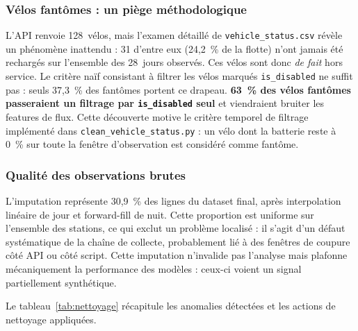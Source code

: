 \documentclass[fleqn, 12pt]{scrartcl}
\begin{document}
\subsubsection*{Vélos fantômes : un piège méthodologique}

L'API renvoie 128~vélos, mais l'examen détaillé de \texttt{vehicle\_status.csv} révèle un phénomène inattendu : 31 d'entre eux (24{,}2~\% de la flotte) n'ont jamais été rechargés sur l'ensemble des 28~jours observés. Ces vélos sont donc \emph{de fait} hors service. Le critère naïf consistant à filtrer les vélos marqués \texttt{is\_disabled} ne suffit pas : seuls 37{,}3~\% des fantômes portent ce drapeau. \textbf{63~\% des vélos fantômes passeraient un filtrage par \texttt{is\_disabled} seul} et viendraient bruiter les features de flux. Cette découverte motive le critère temporel de filtrage implémenté dans \texttt{clean\_vehicle\_status.py} : un vélo dont la batterie reste à 0~\% sur toute la fenêtre d'observation est considéré comme fantôme.

\subsubsection*{Qualité des observations brutes}

L'imputation représente 30{,}9~\% des lignes du dataset final, après interpolation linéaire de jour et forward-fill de nuit. Cette proportion est uniforme sur l'ensemble des stations, ce qui exclut un problème localisé : il s'agit d'un défaut systématique de la chaîne de collecte, probablement lié à des fenêtres de coupure côté API ou côté script. Cette imputation n'invalide pas l'analyse mais plafonne mécaniquement la performance des modèles : ceux-ci voient un signal partiellement synthétique.

\vspace{0.3cm}

Le tableau~\ref{tab:nettoyage} récapitule les anomalies détectées et les actions de nettoyage appliquées.
\end{document}
